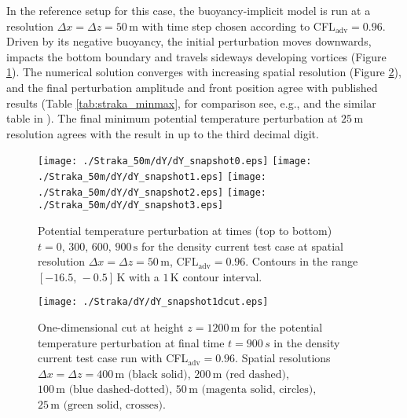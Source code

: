 \documentclass[12pt,a4paper]{article}
\theoremstyle{definition}
\begin{document}
In the reference setup for this case, the buoyancy-implicit model is run at a resolution $\Delta x=\Delta z=50\,\textrm{m}$ with time step chosen according to CFL$_\textrm{adv}=0.96$. Driven by its negative buoyancy, the initial perturbation moves downwards, impacts the bottom boundary and travels sideways developing vortices (Figure \ref{fig:straka}). The numerical solution converges with increasing spatial resolution (Figure \ref{fig:straka1dcut}), and the final perturbation amplitude and front position agree with published results (Table \ref{tab:straka_minmax}, for comparison see, e.g., \cite{GiraldoRestelli2008} and the similar table in \cite{MelvinEtAl2018}). The final minimum potential temperature perturbation at $25\,\textrm{m}$ resolution agrees with the result in \cite{MelvinEtAl2018} up to the third decimal digit.

\begin{figure}
\centering
 \texttt{[image: ./Straka\_50m/dY/dY\_snapshot0.eps]}
 \texttt{[image: ./Straka\_50m/dY/dY\_snapshot1.eps]}
 \texttt{[image: ./Straka\_50m/dY/dY\_snapshot2.eps]}
 \texttt{[image: ./Straka\_50m/dY/dY\_snapshot3.eps]}
 \caption{Potential temperature perturbation at times (top to bottom) $t=0,\,300,\,600,\,900\,\textrm{s}$ for the density current test case at spatial resolution $\Delta x=\Delta z=50\,\textrm{m}$, CFL$_\textrm{adv}=0.96$. Contours in the range $[-16.5,\,-0.5]\,\textrm{K}$ with a $1\,\textrm{K}$ contour interval.}
 \label{fig:straka}
\end{figure}

\begin{figure}
\centering
  \texttt{[image: ./Straka/dY/dY\_snapshot1dcut.eps]}
 \caption{One-dimensional cut at height $z=1200\,\textrm{m}$ for the potential temperature perturbation at final time $t=900\, s$ in the density current test case run with CFL$_\textrm{adv}=0.96$. Spatial resolutions $\Delta x=\Delta z=400\,\textrm{m (black solid)}$, $200\,\textrm{m (red dashed)}$, $100\,\textrm{m (blue dashed-dotted)}$, $50\,\textrm{m (magenta solid, circles)}$, $25\,\textrm{m (green solid, crosses)}$.}
 \label{fig:straka1dcut}
\end{figure}
\end{document}

